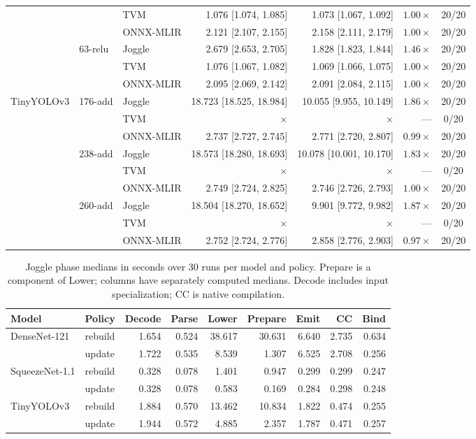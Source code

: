 \begin{table}[!htbp]
\begin{tabular*}{\textwidth}{@{\extracolsep{\fill}}lllrrrc@{}}
 &  & TVM & 1.076 [1.074, 1.085] & 1.073 [1.067, 1.092] & $1.00\times$ & 20/20 \\
 &  & ONNX-MLIR & 2.121 [2.107, 2.155] & 2.158 [2.111, 2.179] & $1.00\times$ & 20/20 \\
 & 63-relu & Joggle & 2.679 [2.653, 2.705] & 1.828 [1.823, 1.844] & $1.46\times$ & 20/20 \\
 &  & TVM & 1.076 [1.067, 1.082] & 1.069 [1.066, 1.075] & $1.00\times$ & 20/20 \\
 &  & ONNX-MLIR & 2.095 [2.069, 2.142] & 2.091 [2.084, 2.115] & $1.00\times$ & 20/20 \\
\midrule
TinyYOLOv3 & 176-add & Joggle & 18.723 [18.525, 18.984] & 10.055 [9.955, 10.149] & $1.86\times$ & 20/20 \\
 &  & TVM & $\times$ & $\times$ & --- & 0/20 \\
 &  & ONNX-MLIR & 2.737 [2.727, 2.745] & 2.771 [2.720, 2.807] & $0.99\times$ & 20/20 \\
 & 238-add & Joggle & 18.573 [18.280, 18.693] & 10.078 [10.001, 10.170] & $1.83\times$ & 20/20 \\
 &  & TVM & $\times$ & $\times$ & --- & 0/20 \\
 &  & ONNX-MLIR & 2.749 [2.724, 2.825] & 2.746 [2.726, 2.793] & $1.00\times$ & 20/20 \\
 & 260-add & Joggle & 18.504 [18.270, 18.652] & 9.901 [9.772, 9.982] & $1.87\times$ & 20/20 \\
 &  & TVM & $\times$ & $\times$ & --- & 0/20 \\
 &  & ONNX-MLIR & 2.752 [2.724, 2.776] & 2.858 [2.776, 2.903] & $0.97\times$ & 20/20 \\
\bottomrule\end{tabular*}\end{table}
\begin{table}[!htbp]
\centering\scriptsize
\caption{Joggle phase medians in seconds over 30 runs per model and policy. Prepare is a component of Lower; columns have separately computed medians. Decode includes input specialization; CC is native compilation.}
\label{tab:update-phases}
\setlength{\tabcolsep}{3pt}
\begin{tabular*}{\textwidth}{@{\extracolsep{\fill}}llrrrrrrr@{}}
\toprule Model & Policy & Decode & Parse & Lower & Prepare & Emit & CC & Bind \\
\midrule
DenseNet-121 & rebuild & 1.654 & 0.524 & 38.617 & 30.631 & 6.640 & 2.735 & 0.634 \\
 & update & 1.722 & 0.535 & 8.539 & 1.307 & 6.525 & 2.708 & 0.256 \\
SqueezeNet-1.1 & rebuild & 0.328 & 0.078 & 1.401 & 0.947 & 0.299 & 0.299 & 0.247 \\
 & update & 0.328 & 0.078 & 0.583 & 0.169 & 0.284 & 0.298 & 0.248 \\
TinyYOLOv3 & rebuild & 1.884 & 0.570 & 13.462 & 10.834 & 1.822 & 0.474 & 0.255 \\
 & update & 1.944 & 0.572 & 4.885 & 2.357 & 1.787 & 0.471 & 0.257 \\
\bottomrule\end{tabular*}\end{table}

